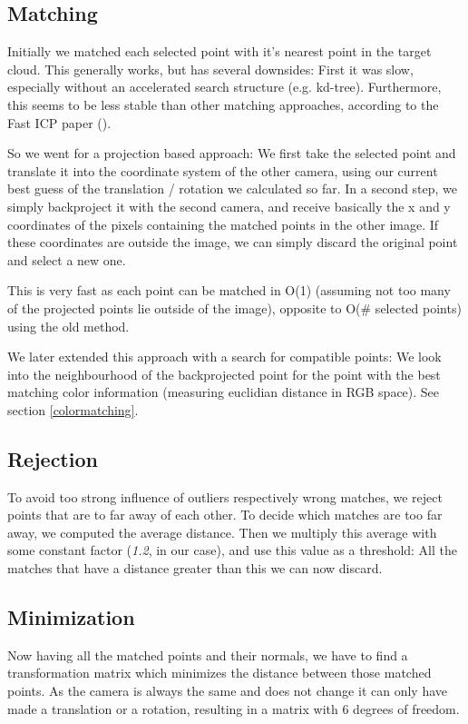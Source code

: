 \documentclass[10pt,twocolumn,letterpaper]{article}
\begin{document}
\subsection{Matching}
\label{backprojection}

Initially we matched each selected point with it's nearest point in the target cloud. 
This generally works, but has several downsides: First it was slow, especially without an accelerated search structure (e.g. kd-tree). 
Furthermore, this seems to be less stable than other matching approaches, according to the Fast ICP paper (\cite{fasticp}).

So we went for a projection based approach: We first take the selected point and translate it into the coordinate system of the other camera,
using our current best guess of the translation / rotation we calculated so far. In a second step, we simply backproject it with the second camera,
and receive basically the x and y coordinates of the pixels containing the matched points in the other image. If these coordinates are outside the image,
we can simply discard the original point and select a new one.

This is very fast as each point can be matched in O(1) (assuming not too many of the projected points lie outside of the image), opposite to
O(\# selected points) using the old method.

We later extended this approach with a search for compatible points: We look into the neighbourhood of the backprojected point
for the point with the best matching color information (measuring euclidian distance in RGB space). See section \ref{colormatching}.

\subsection{Rejection}
To avoid too strong influence of outliers respectively wrong matches, we reject points that are to far away of each other. 
To decide which matches are too far away, we computed the average distance. Then we multiply this average with some constant
factor (\textit{1.2}, in our case), and use this value as a threshold: All the matches that have a distance greater than this
we can now discard.

\subsection{Minimization}
\label{minimization}
Now having all the matched points and their normals, we have to find a transformation matrix which minimizes the distance between those matched points.
As the camera is always the same and does not change it can only have made a translation or a rotation, resulting in a matrix with 6 degrees of freedom.
\end{document}
